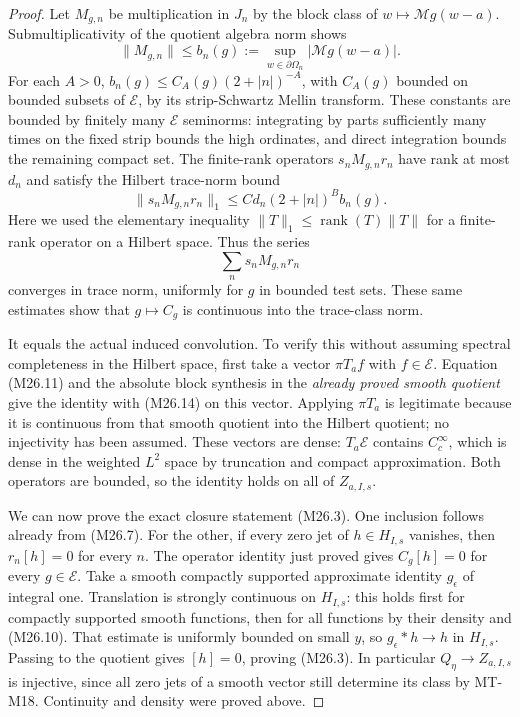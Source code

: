 \documentclass[11pt,a4paper]{article}
\begin{document}
\begin{proof}
Let $M_{g,n}$ be multiplication in $J_n$ by the block class
of $w\mapsto\mathcal Mg(w-a)$. Submultiplicativity of the
quotient algebra norm shows
\[
 \|M_{g,n}\|\le b_n(g):=
       \sup_{w\in\partial\Omega_n}|\mathcal Mg(w-a)|.
                                                               \tag{M26.12}
\]
For each $A>0$, $b_n(g)\le C_A(g)(2+|n|)^{-A}$,
with $C_A(g)$ bounded on bounded subsets of $\mathcal E$,
by its strip-Schwartz Mellin transform. These constants
are bounded by finitely many $\mathcal E$ seminorms:
integrating by parts sufficiently many times on the
fixed strip bounds the high ordinates, and direct
integration bounds the remaining compact set. The finite-rank
operators $s_nM_{g,n}r_n$ have rank at most $d_n$ and
satisfy the Hilbert trace-norm bound
\[
 \|s_nM_{g,n}r_n\|_1
       \le C d_n(2+|n|)^B b_n(g).
                                                               \tag{M26.13}
\]
Here we used the elementary inequality
$\|T\|_1\le\operatorname{rank}(T)\|T\|$ for a finite-rank
operator on a Hilbert space. Thus the series
\[
                     \sum_n s_nM_{g,n}r_n
                                                               \tag{M26.14}
\]
converges in trace norm, uniformly for $g$ in bounded test
sets. These same estimates show that
$g\mapsto C_g$ is continuous into the trace-class norm.

It equals the actual induced convolution. To verify this
without assuming spectral completeness in the Hilbert
space, first take a vector $\pi T_af$ with $f\in\mathcal E$.
Equation (M26.11) and the absolute block synthesis in the
\emph{already proved smooth quotient} give the identity
with (M26.14) on this vector. Applying $\pi T_a$ is
legitimate because it is continuous from that smooth
quotient into the Hilbert quotient; no injectivity has
been assumed. These vectors are dense: $T_a\mathcal E$
contains $C_c^\infty$, which is dense in the weighted
$L^2$ space by truncation and compact approximation.
Both operators are bounded, so the identity holds on
all of $Z_{a,I,s}$.

We can now prove the exact closure statement (M26.3).
One inclusion follows already from (M26.7). For the other,
if every zero jet of $h\in H_{I,s}$ vanishes, then
$r_n[ h ]=0$ for every $n$. The operator identity just
proved gives $C_g[h]=0$ for every $g\in\mathcal E$.
Take a smooth compactly supported approximate identity
$g_\epsilon$ of integral one. Translation is strongly
continuous on $H_{I,s}$: this holds first for compactly
supported smooth functions, then for all functions by
their density and (M26.10). That estimate is uniformly
bounded on small $y$, so
$g_\epsilon*h\to h$ in $H_{I,s}$.
Passing to the quotient gives $[h]=0$, proving (M26.3).
In particular $Q_\eta\to Z_{a,I,s}$ is injective, since
all zero jets of a smooth vector still determine its
class by MT-M18. Continuity and density were proved above.


\end{proof}
\end{document}
